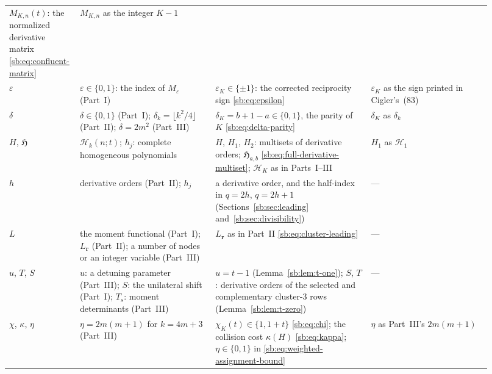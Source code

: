 \documentclass[11pt]{article}
\theoremstyle{definition}
\theoremstyle{remark}
\newcommand{\Ht}{\mathcal H}
\newcommand{\eps}{\varepsilon}
\newcommand{\epsK}{\varepsilon}
\theoremstyle{definition}
\theoremstyle{plain}
\numberwithin{equation}{section}
\begin{document}
{\begin{longtable}{@{}>{\raggedright\arraybackslash}p{0.10\linewidth}>{\raggedright\arraybackslash}p{0.27\linewidth}>{\raggedright\arraybackslash}p{0.31\linewidth}>{\raggedright\arraybackslash}p{0.24\linewidth}@{}}
$M_{K,n}(t)$: the normalized derivative matrix \eqref{sb:eq:confluent-matrix} &
$M_{K,n}$ as the integer $K-1$\\[3pt]
$\eps$ &
$\eps\in\{0,1\}$: the index of $M_\eps$ (Part~I) &
$\epsK_K\in\{\pm1\}$: the corrected reciprocity sign \eqref{sb:eq:epsilon} &
$\epsK_K$ as the sign printed in Cigler's~(83)\\[3pt]
$\delta$ &
$\delta\in\{0,1\}$ (Part~I); $\delta_k=\lfloor k^2/4\rfloor$ (Part~II);
$\delta=2m^2$ (Part~III) &
$\delta_K=b+1-a\in\{0,1\}$, the parity of $K$ \eqref{sb:eq:delta-parity} &
$\delta_K$ as $\delta_k$\\[3pt]
$H$, $\mathfrak H$ &
$\Ht_k(n;t)$; $h_j$: complete homogeneous polynomials &
$H$, $H_1$, $H_2$: multisets of derivative orders; $\mathfrak H_{a,b}$
\eqref{sb:eq:full-derivative-multiset}; $\Ht_K$ as in Parts~I--III &
$H_1$ as $\Ht_1$\\[3pt]
$h$ &
derivative orders (Part~II); $h_j$ &
a derivative order, and the half-index in $q=2h$, $q=2h+1$
(Sections~\ref{sb:sec:leading} and~\ref{sb:sec:divisibility}) &
---\\[3pt]
$L$ &
the moment functional (Part~I); $L_{\boldsymbol r}$ (Part~II); a number of
nodes or an integer variable (Part~III) &
$L_{\boldsymbol r}$ as in Part~II \eqref{sb:eq:cluster-leading} &
---\\[3pt]
$u$, $T$, $S$ &
$u$: a detuning parameter (Part~III); $S$: the unilateral shift (Part~I);
$T_s$: moment determinants (Part~III) &
$u=t-1$ (Lemma~\ref{sb:lem:t-one}); $S$, $T$: derivative orders of the
selected and complementary cluster-$3$ rows (Lemma~\ref{sb:lem:t-zero}) &
---\\[3pt]
$\chi$, $\kappa$, $\eta$ &
$\eta=2m(m+1)$ for $k=4m+3$ (Part~III) &
$\chi_K(t)\in\{1,1+t\}$ \eqref{sb:eq:chi}; the collision cost $\kappa(H)$
\eqref{sb:eq:kappa}; $\eta\in\{0,1\}$ in
\eqref{sb:eq:weighted-assignment-bound} &
$\eta$ as Part~III's $2m(m+1)$\\
\bottomrule
\end{longtable}}
\end{document}

